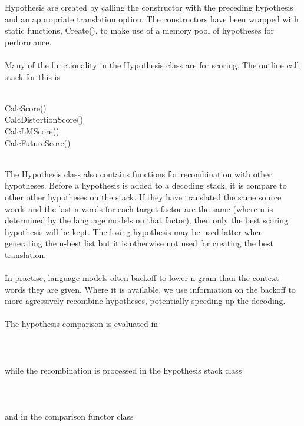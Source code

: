 \documentclass[10pt]{report}
\theoremstyle{plain}
\begin{document}
{Hypothesis are created by calling the constructor with the preceding hypothesis and an appropriate translation option. The constructors have been wrapped with static functions, Create(), to make use of a memory pool of hypotheses for performance.\\
\\
Many of the functionality in the Hypothesis class are for scoring. The outline call stack for this is\\
\\
\begin{tt}
\indent CalcScore()\\
\indent	\indent	CalcDistortionScore()\\
\indent	\indent	CalcLMScore()\\
\indent	\indent	CalcFutureScore()\\
\end{tt}
\\
The Hypothesis class also contains functions for recombination with other hypotheses. Before a hypothesis is added to a decoding stack, it is compare to other other hypotheses on the stack. If they have translated the same source words and the last n-words for each target factor are the same (where n is determined by the language models on that factor), then only the best scoring hypothesis will be kept. The losing hypothesis may be used latter when generating the n-best list but it is otherwise not used for creating the best translation.\\
\\
In practise, language models often backoff to lower n-gram than the context words they are given. Where it is available, we use information on the backoff to more agressively recombine hypotheses, potentially speeding up the decoding.\\
\\
The hypothesis comparison is evaluated in \\
\\
\\
\\
while the recombination is processed in the hypothesis stack class\\
\\
\\
\\
and in the comparison functor class\\
\\
}
\end{document}
